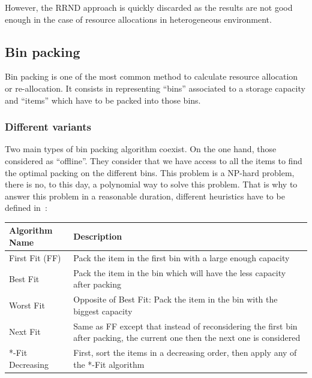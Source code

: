 However, the RRND approach is quickly discarded as the results are not good
enough in the case of resource allocations in heterogeneous environment.

\subsection{Bin packing}

Bin packing is one of the most common method to calculate resource allocation
or re-allocation. It consists in representing “bins” associated to a storage
capacity and “items” which have to be packed into those bins.

\subsubsection{Different variants}

Two main types of bin packing algorithm coexist. On the one hand, those
considered as “offline”. They consider that we have access to all the items to
find the optimal packing on the different bins. This problem is a NP-hard
problem, there is no, to this day, a polynomial way to solve this problem.
That is why to answer this problem in a reasonable duration, different
heuristics have to be defined in~\cite*{mathsBpheuristics}:

\vspace{1em}
\begin{center}
	\begin{tabular}{| l | p{7cm} |}
		\hline
		Algorithm Name & Description \\
		\hline
		First Fit (FF) & Pack the item in the first bin with a large enough capacity \\
		\hline
		Best Fit & Pack the item in the bin which will have the less capacity after packing \\
		\hline
		Worst Fit & Opposite of Best Fit: Pack the item in the bin with the biggest capacity \\
		\hline
		Next Fit & Same as FF except that instead of reconsidering the first bin after packing, the current one then the next one is considered \\
		\hline
		*-Fit Decreasing & First, sort the items in a decreasing order, then apply any of the *-Fit algorithm \\
		\hline
	\end{tabular}
\end{center}
\vspace{1em}

